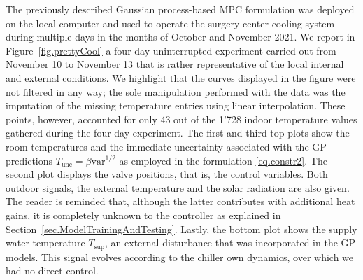 The previously described Gaussian process-based MPC formulation was deployed on the local computer and used to operate the surgery center cooling system during multiple days in the months of October and November 2021. We report in Figure~\ref{fig.prettyCool} a four-day uninterrupted experiment carried out from November 10 to November 13 that is rather representative of the local internal and external conditions. We highlight that the curves displayed in the figure were not filtered in any way; the sole manipulation performed with the data was the imputation of the missing temperature entries using linear interpolation. These points, however, accounted for only 43 out of the 1'728 indoor temperature values gathered during the four-day experiment. The first and third top plots show the room temperatures and the immediate uncertainty associated with the GP predictions $T_\text{unc} = \beta \text{var}^{1/2}$ as employed in the formulation \eqref{eq.constr2}. The second plot displays the valve positions, that is, the control variables. Both outdoor signals, the external temperature and the solar radiation are also given. The reader is reminded that, although the latter contributes with additional heat gains, it is completely unknown to the controller as explained in Section~\ref{sec.ModelTrainingAndTesting}. Lastly, the bottom plot shows the supply water temperature $T_\text{sup}$, an external disturbance that was incorporated in the GP models. This signal evolves according to the chiller own dynamics, over which we had no direct control.


